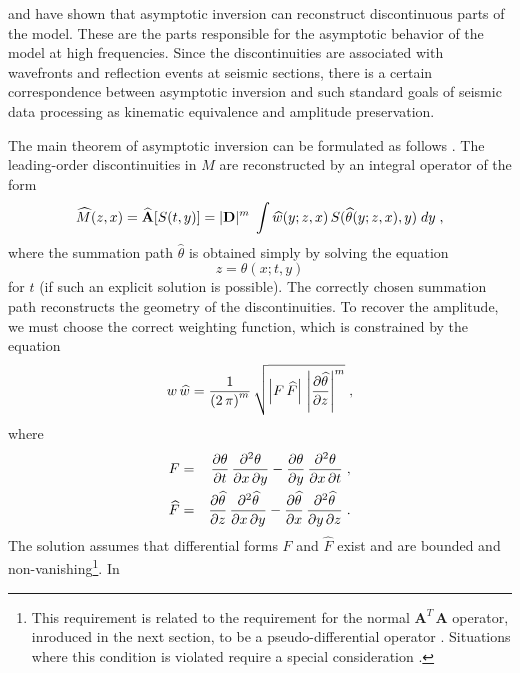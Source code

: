 \cite{beylkin} and \cite{goldin} have shown that asymptotic 
inversion can
reconstruct discontinuous parts of the model. These are the parts
responsible for the asymptotic behavior of the model at high
frequencies. Since the discontinuities are associated with wavefronts
and reflection events at seismic sections, there is a certain
correspondence between asymptotic inversion and such standard goals of
seismic data processing as kinematic equivalence and amplitude
preservation.
\par
The main theorem of asymptotic inversion can be formulated as follows
\cite[]{goldin}. The leading-order discontinuities in $M$ are
reconstructed by an integral operator of the form
\begin{equation}
\widehat{M}(z,x)={\bf \widehat{A}}[S(t,y)]=
|{\bf D}|^m\;\int \widehat{w}(y;z,x)\,S(\widehat{\theta}(y;z,x),y)\;dy\;,
\label{eqn:inverse}
\end{equation}
where the summation path $\widehat{\theta}$ is obtained simply by
solving the equation
\begin{equation}
z=\theta(x;t,y)
\label{eqn:summ}
\end{equation}
for $t$ (if such an explicit solution is possible). The correctly
chosen summation path reconstructs the geometry of the
discontinuities. To recover the amplitude, we must choose the correct
weighting function, which is constrained by the equation
\cite[]{beylkin,goldin}
\begin{equation}
w\,\widehat{w}={1\over{\left(2\,\pi\right)^m}} \, 
{\sqrt{\left|F\,\widehat{F}\right|\,
\left|\partial \widehat{\theta} \over \partial z\right|^m}}\;,
\label{eqn:whatw}
\end{equation} 
where
\begin{eqnarray}
F & = & {\partial \theta \over \partial t}\,
{\partial^2 \theta \over \partial x\, \partial y} -
{\partial \theta \over \partial y}\,
{\partial^2 \theta \over \partial x\, \partial t}\;, 
 \\
\widehat{F} & = & {\partial \widehat{\theta} \over \partial z}\,
{\partial^2 \widehat{\theta} \over \partial x\, \partial y} -
{\partial \widehat{\theta} \over \partial x}\,
{\partial^2 \widehat{\theta} \over \partial y\, \partial z}\;. 
\end{eqnarray} 
The solution assumes that differential forms $F$ and $\widehat{F}$
exist and are bounded and non-vanishing\footnote{This requirement is
related to the requirement for the normal $\mathbf{A}^{T}\,\mathbf{A}$
operator, inroduced in the next section, to be a pseudo-differential
operator \cite[]{wong}.  Situations where this condition is violated
require a special consideration \cite[]{SEG-1996-0359,stolk}.}.  In
